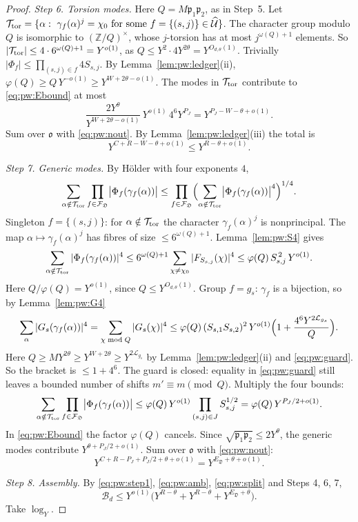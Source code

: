 \documentclass{amsart}
\theoremstyle{definition}
\theoremstyle{plain}
\numberwithin{equation}{section}
\numberwithin{table}{section}
\begin{document}
\begin{proof}
\emph{Step 6. Torsion modes.} Here $Q=M\mathfrak p_1\mathfrak p_2$, as in
Step~5. Let
$\mathcal T_{\rm tor}=\{\alpha:\ \gamma_f(\alpha)^j=\chi_0\ \text{for some}\
f=\{(s,j)\}\in\widehat{\mathcal U}\}$. The character group modulo $Q$ is isomorphic to
$(\mathbb Z/Q)^\times$, whose $j$-torsion has at most $j^{\omega(Q)+1}$
elements. So $|\mathcal T_{\rm tor}|\le4\cdot6^{\omega(Q)+1}=Y^{o(1)}$, as
$Q\le Y^2\cdot4Y^{2\theta}=Y^{O_{d,\theta}(1)}$.
Trivially $|\Phi_f|\le\prod_{(s,j)\in f}4S_{s,j}$. By
Lemma~\ref{lem:pw:ledger}(ii), $\varphi(Q)\ge Q\,Y^{-o(1)}\ge
Y^{W+2\theta-o(1)}$. The modes in $\mathcal T_{\rm tor}$ contribute to
\eqref{eq:pw:Ebound} at most
\[
 \frac{2Y^{\theta}}{Y^{W+2\theta-o(1)}}\,Y^{o(1)}\,4^6Y^{P_J}
 =Y^{P_J-W-\theta+o(1)} .
\]
Sum over $\mathfrak o$ with \eqref{eq:pw:nout}. By
Lemma~\ref{lem:pw:ledger}(iii) the total is
\[
 Y^{C+R-W-\theta+o(1)}\le Y^{R-\theta+o(1)} .
\]

\emph{Step 7. Generic modes.} By Hölder with four exponents $4$,
\[
 \sum_{\alpha\notin\mathcal T_{\rm tor}}\prod_{f\in\mathcal F_{\mathfrak D}}\bigl|\Phi_f(\gamma_f(\alpha))\bigr|
 \le\prod_{f\in\mathcal F_{\mathfrak D}}\Bigl(\sum_{\alpha\notin\mathcal T_{\rm tor}}\bigl|\Phi_f(\gamma_f(\alpha))\bigr|^4\Bigr)^{1/4}.
\]
Singleton $f=\{(s,j)\}$: for $\alpha\notin\mathcal T_{\rm tor}$ the character
$\gamma_f(\alpha)^j$ is nonprincipal. The map $\alpha\mapsto\gamma_f(\alpha)^j$
has fibres of size $\le6^{\omega(Q)+1}$. Lemma~\ref{lem:pw:S4} gives
\[
 \sum_{\alpha\notin\mathcal T_{\rm tor}}|\Phi_f(\gamma_f(\alpha))|^4
 \le6^{\omega(Q)+1}\sum_{\chi\ne\chi_0}|F_{S_{s,j}}(\chi)|^4
 \le\varphi(Q)\,S_{s,j}^{\,2}\,Y^{o(1)} .
\]
Here $Q/\varphi(Q)=Y^{o(1)}$, since $Q\le Y^{O_{d,\theta}(1)}$.
Group $f=g_s$: $\gamma_f$ is a bijection, so by Lemma~\ref{lem:pw:G4}
\[
 \sum_{\alpha}|G_s(\gamma_f(\alpha))|^4=\sum_{\chi\bmod Q}|G_s(\chi)|^4
\le\varphi(Q)\,(S_{s,1}S_{s,2})^2\,Y^{o(1)}\Bigl(1+\frac{4^6Y^{2\mathcal L_{g_s}}}{Q}\Bigr).
\]
Here $Q\ge MY^{2\theta}\ge Y^{W+2\theta}\ge Y^{2\mathcal L_{g_s}}$ by
Lemma~\ref{lem:pw:ledger}(ii) and \eqref{eq:pw:guard}. So the bracket is
$\le1+4^6$. The guard is closed: equality in \eqref{eq:pw:guard} still leaves a
bounded number of shifts $m'\equiv m\pmod Q$. Multiply the four bounds:
\[
 \sum_{\alpha\notin\mathcal T_{\rm tor}}\prod_{f\in\mathcal F_{\mathfrak D}}\bigl|\Phi_f(\gamma_f(\alpha))\bigr|
 \le\varphi(Q)\,Y^{o(1)}\prod_{(s,j)\in J}S_{s,j}^{1/2}
 =\varphi(Q)\,Y^{P_J/2+o(1)} .
\]
In \eqref{eq:pw:Ebound} the factor $\varphi(Q)$ cancels. Since
$\sqrt{\mathfrak p_1\mathfrak p_2}\le2Y^\theta$, the generic modes contribute
$Y^{\theta+P_J/2+o(1)}$. Sum over $\mathfrak o$ with \eqref{eq:pw:nout}:
\[
 Y^{C+R-P_J+P_J/2+\theta+o(1)}=Y^{E_{\mathfrak D}+\theta+o(1)} .
\]

\emph{Step 8. Assembly.} By \eqref{eq:pw:step1}, \eqref{eq:pw:amb},
\eqref{eq:pw:split} and Steps 4, 6, 7,
\[
 \mathcal B_d\le Y^{o(1)}\bigl(Y^{R-\theta}+Y^{R-\theta}+Y^{E_{\mathfrak D}+\theta}\bigr).
\]
Take $\log_Y$.
\end{proof}
\end{document}

